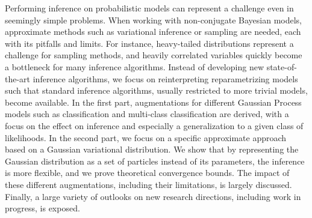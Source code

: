 
\ifCLASSINFOlangDE
{}
\fi

\begin{abstracts}        %
Performing inference on probabilistic models can represent a challenge even in seemingly simple problems.
When working with non-conjugate Bayesian models, approximate methods such as variational inference or sampling are needed, each with its pitfalls and limits.
For instance, heavy-tailed distributions represent a challenge for sampling methods, and heavily correlated variables quickly become a bottleneck for many inference algorithms.
Instead of developing new state-of-the-art inference algorithms, we focus on reinterpreting reparametrizing models such that standard inference algorithms, usually restricted to more trivial models, become available.
In the first part, augmentations for different Gaussian Process models such as classification and multi-class classification are derived, with a focus on the effect on inference and especially a generalization to a given class of likelihoods.
In the second part, we focus on a specific approximate approach based on a Gaussian variational distribution.
We show that by representing the Gaussian distribution as a set of particles instead of its parameters, the inference is more flexible, and we prove theoretical convergence bounds.
The impact of these different augmentations, including their limitations, is largely discussed.
Finally, a large variety of outlooks on new research directions, including work in progress, is exposed.


\end{abstracts}
\ifCLASSINFOlangDE
{}
\fi

